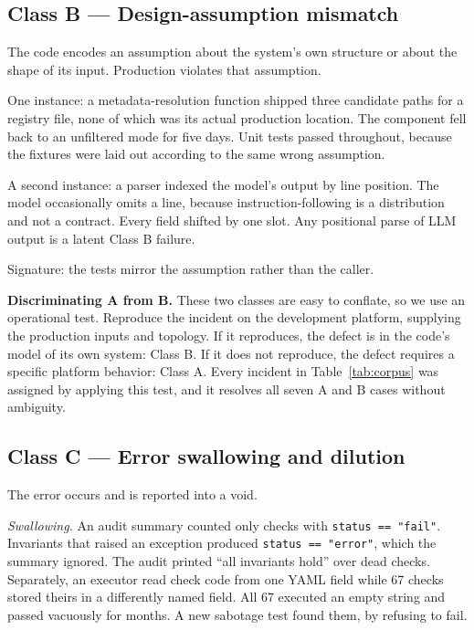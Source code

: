 \documentclass[conference]{IEEEtran}
\begin{document}
\subsection{Class B --- Design-assumption mismatch}
\label{sec:classb}

The code encodes an assumption about the system's own structure or about the
shape of its input. Production violates that assumption.

One instance: a metadata-resolution function shipped three candidate paths
for a registry file, none of which was its actual production location. The
component fell back to an unfiltered mode for five days. Unit tests passed
throughout, because the fixtures were laid out according to the same wrong
assumption.

A second instance: a parser indexed the model's output by line position. The
model occasionally omits a line, because instruction-following is a
distribution and not a contract. Every field shifted by one slot. Any
positional parse of LLM output is a latent Class B failure.

Signature: the tests mirror the assumption rather than the caller.

\textbf{Discriminating A from B.} These two classes are easy to conflate, so
we use an operational test. Reproduce the incident on the development
platform, supplying the production inputs and topology. If it reproduces,
the defect is in the code's model of its own system: Class B. If it does not
reproduce, the defect requires a specific platform behavior: Class A. Every
incident in Table~\ref{tab:corpus} was assigned by applying this test, and
it resolves all seven A and B cases without ambiguity.

\subsection{Class C --- Error swallowing and dilution}
\label{sec:classc}

The error occurs and is reported into a void.

\emph{Swallowing.} An audit summary counted only checks with
\texttt{status == "fail"}. Invariants that raised an exception produced
\texttt{status == "error"}, which the summary ignored. The audit printed
``all invariants hold'' over dead checks. Separately, an executor read check
code from one YAML field while 67 checks stored theirs in a differently
named field. All 67 executed an empty string and passed vacuously for
months. A new sabotage test found them, by refusing to fail.
\end{document}
